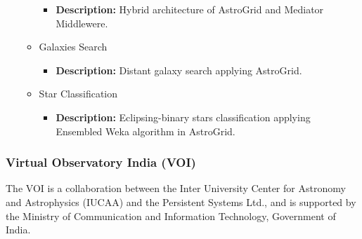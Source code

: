 \begin{itemize}
\begin{itemize}
\begin{itemize}
\item \textbf{Description:} Hybrid architecture of AstroGrid and Mediator
Middlewere.
\end{itemize}
\item Galaxies Search
\begin{itemize}
\item \textbf{Description:} Distant galaxy search applying AstroGrid.
\end{itemize}
\item Star Classification
\begin{itemize}
\item \textbf{Description:} Eclipsing-binary stars classification applying
Ensembled Weka algorithm in AstroGrid.
\end{itemize}
\end{itemize}
\end{itemize}

\subsubsection{Virtual Observatory India (VOI)}
The VOI is a collaboration between the Inter University Center for Astronomy and
Astrophysics (IUCAA) and the Persistent Systems Ltd., and is supported by the
Ministry of Communication and Information Technology, Government of India.

